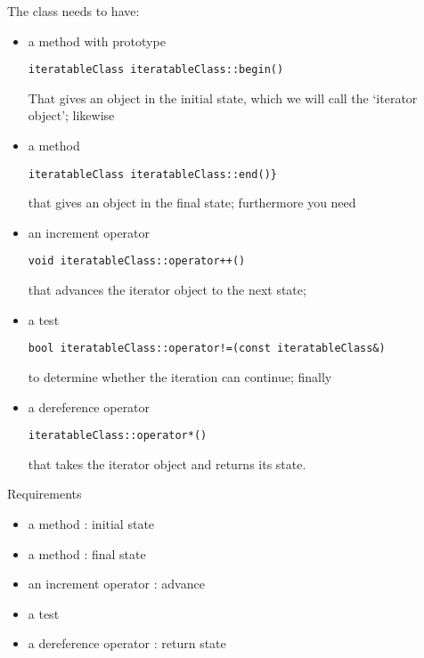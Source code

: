 The class needs to have:
\begin{itemize}
\item a method  with prototype
\begin{lstlisting}
iteratableClass iteratableClass::begin()
\end{lstlisting}
That gives an
  object in the initial state, which we will call the `iterator object'; likewise
\item a method 
\begin{lstlisting}
iteratableClass iteratableClass::end()} 
\end{lstlisting}
that gives an 
  object in the final state; furthermore you need
\item an increment operator
\begin{lstlisting}
void iteratableClass::operator++()
\end{lstlisting}
that
  advances the iterator object to the next state;
\item a test
\begin{lstlisting}
bool iteratableClass::operator!=(const iteratableClass&)
\end{lstlisting}
to determine
  whether the iteration can continue; finally
\item a dereference operator 
\begin{lstlisting}
iteratableClass::operator*()
\end{lstlisting}
that takes the iterator object and returns its state.
\end{itemize}

\begin{slide}{Requirements}
  \label{sl:rangemethods}
  \begin{itemize}
  \item a method : initial state
  \item a method :  final state
  \item an increment operator : advance
  \item a test 
  \item a dereference operator : return state
  \end{itemize}
\end{slide}

